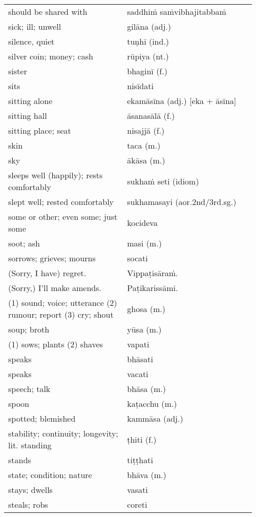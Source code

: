 \documentclass[a5paper]{memoir}
\begin{document}
\begin{longtable}{L{0.48\linewidth} L{0.48\linewidth} H}
should be shared with & saddhiṁ saṁvibhajitabbaṁ & \\[0pt]
sick; ill; unwell & gilāna (adj.) & \\[0pt]
silence, quiet & tuṇhī (ind.) & \\[0pt]
silver coin; money; cash & rūpiya (nt.) & \\[0pt]
sister & bhaginī (f.) & \\[0pt]
sits & nisīdati & \\[0pt]
sitting alone & ekamāsīna (adj.) [eka + āsīna] & \\[0pt]
sitting hall & āsanasālā (f.) & \\[0pt]
sitting place; seat & nisajjā (f.) & \\[0pt]
skin & taca (m.) & \\[0pt]
sky & ākāsa (m.) & \\[0pt]
sleeps well (happily); rests comfortably & sukhaṁ seti (idiom) & \\[0pt]
slept well; rested comfortably & sukhamasayi (aor.2nd/3rd.sg.) & \\[0pt]
some or other; even some; just some & kocideva & \\[0pt]
soot; ash & masi (m.) & \\[0pt]
sorrows; grieves; mourns & socati & \\[0pt]
(Sorry, I have) regret. & Vippaṭisāraṁ. & \\[0pt]
(Sorry,) I'll make amends. & Paṭikarissāmi. & \\[0pt]
(1) sound; voice; utterance (2) rumour; report (3) cry; shout & ghosa (m.) & \\[0pt]
soup; broth & yūsa (m.) & \\[0pt]
(1) sows; plants (2) shaves & vapati & \\[0pt]
speaks & bhāsati & \\[0pt]
speaks & vacati & \\[0pt]
speech; talk & bhāsa (m.) & \\[0pt]
spoon & kaṭacchu (m.) & \\[0pt]
spotted; blemished & kammāsa (adj.) & \\[0pt]
stability; continuity; longevity; lit. standing & ṭhiti (f.) & \\[0pt]
stands & tiṭṭhati & \\[0pt]
state; condition; nature & bhāva (m.) & \\[0pt]
stays; dwells & vasati & \\[0pt]
steals; robs & coreti & \\[0pt]

\end{longtable}
\end{document}
